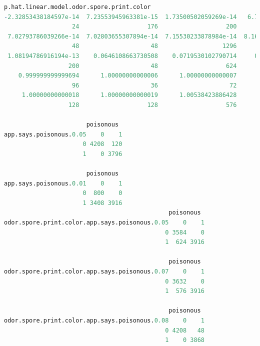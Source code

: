 \documentclass[12pt]{article}
\begin{document}
\begin{lstlisting}[language = R]
p.hat.linear.model.odor.spore.print.color
-2.32853438184597e-14  7.23553945963381e-15  1.73500502059269e-14   6.7559392891808e-14  6.88284893569256e-14 
                   24                   176                   200                    24                    48 
 7.02793786039266e-14  7.02803655307894e-14  7.15530233878984e-14  8.16675341341915e-14  9.80802761699014e-14 
                   48                    48                  1296                  1344                   176 
 1.08194786916194e-13    0.0646108663730508    0.0719530102790714     0.998042094958255     0.999999999999684 
                  200                    48                   624                  1584                    96 
    0.999999999999694      1.00000000000006      1.00000000000007      1.00000000000009      1.00000000000016 
                   96                    36                    72                   576                   576 
     1.00000000000018      1.00000000000019      1.00538423886428                  <NA> 
                  128                   128                   576                     0 

                       poisonous
app.says.poisonous.0.05    0    1
                      0 4208  120
                      1    0 3796

                       poisonous
app.says.poisonous.0.01    0    1
                      0  800    0
                      1 3408 3916
                                              poisonous
odor.spore.print.color.app.says.poisonous.0.05    0    1
                                             0 3584    0
                                             1  624 3916

                                              poisonous
odor.spore.print.color.app.says.poisonous.0.07    0    1
                                             0 3632    0
                                             1  576 3916

                                              poisonous
odor.spore.print.color.app.says.poisonous.0.08    0    1
                                             0 4208   48
                                             1    0 3868

\end{lstlisting}
\end{document}
